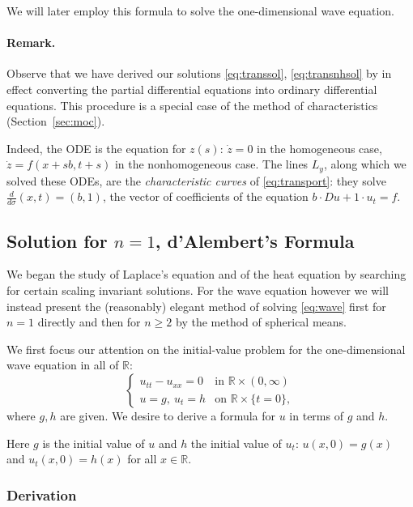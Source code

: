 \documentclass[11pt]{article}
\theoremstyle{plain}
\theoremstyle{definition}
\theoremstyle{remark}
\begin{document}
We will later employ this formula to solve the one-dimensional wave equation.

\paragraph{Remark.} Observe that we have derived our solutions \eqref{eq:transsol}, \eqref{eq:transnhsol} by in effect converting the partial differential equations into ordinary differential equations. This procedure is a special case of the method of characteristics (Section~\ref{sec:moc}).

Indeed, the ODE is the equation for $z(s)$: $\dot z = 0$ in the homogeneous case, $\dot z = f(x + sb, t + s)$ in the nonhomogeneous case. The lines $L_y$, along which we solved these ODEs, are the \emph{characteristic curves} of \eqref{eq:transport}: they solve $\frac{d}{d\sigma}(x,t) = (b,1)$, the vector of coefficients of the equation $b\cdot Du + 1\cdot u_t = f$.

\subsection{Solution for $n = 1$, d'Alembert's Formula}\label{ssec:dalembert}

We began the study of Laplace's equation and of the heat equation by searching for certain scaling invariant solutions. For the wave equation however we will instead present the (reasonably) elegant method of solving \eqref{eq:wave} first for $n = 1$ directly and then for $n \geq 2$ by the method of spherical means.

We first focus our attention on the initial-value problem for the one-dimensional wave equation in all of $\mathbb{R}$:
\begin{equation}\label{eq:wave1d}
\begin{cases} u_{tt} - u_{xx} = 0 & \text{in } \mathbb{R} \times (0,\infty) \\ u = g,\ u_t = h & \text{on } \mathbb{R} \times \{t = 0\}, \end{cases}
\end{equation}
where $g, h$ are given. We desire to derive a formula for $u$ in terms of $g$ and $h$.

Here $g$ is the initial value of $u$ and $h$ the initial value of $u_t$: $u(x,0) = g(x)$ and $u_t(x,0) = h(x)$ for all $x \in \mathbb{R}$.

\subsubsection{Derivation}
\end{document}

